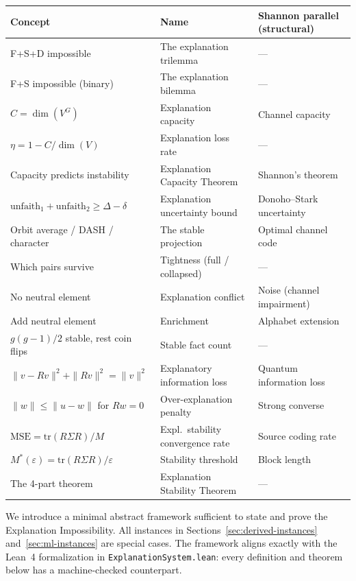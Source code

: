 \documentclass[11pt,a4paper]{article}
\begin{document}
\begin{center}
\small
\begin{tabular}{@{}p{3.5cm}p{4cm}p{5cm}@{}}
\toprule
\textbf{Concept} & \textbf{Name} & \textbf{Shannon parallel (structural)} \\
\midrule
F+S+D impossible & The explanation trilemma & --- \\
F+S impossible (binary) & The explanation bilemma & --- \\
$C = \dim(V^G)$ & Explanation capacity & Channel capacity \\
$\eta = 1 - C/\dim(V)$ & Explanation loss rate & --- \\
Capacity predicts instability & Explanation Capacity Theorem & Shannon's theorem \\
$\mathrm{unfaith}_1 + \mathrm{unfaith}_2 \geq \Delta - \delta$ & Explanation uncertainty bound & Donoho--Stark uncertainty \\
Orbit average / DASH / character & The stable projection & Optimal channel code \\
Which pairs survive & Tightness (full / collapsed) & --- \\
No neutral element & Explanation conflict & Noise (channel impairment) \\
Add neutral element & Enrichment & Alphabet extension \\
$g(g{-}1)/2$ stable, rest coin flips & Stable fact count & --- \\
$\|v{-}Rv\|^2 + \|Rv\|^2 = \|v\|^2$ & Explanatory information loss & Quantum information loss \\
$\|w\| \leq \|u{-}w\|$ for $Rw{=}0$ & Over-explanation penalty & Strong converse \\
$\text{MSE} = \text{tr}(R\Sigma R)/M$ & Expl.\ stability convergence rate & Source coding rate \\
$M^*(\varepsilon) = \text{tr}(R\Sigma R)/\varepsilon$ & Stability threshold & Block length \\
The 4-part theorem & Explanation Stability Theorem & --- \\
\bottomrule
\end{tabular}
\end{center}

We introduce a minimal abstract framework sufficient to state and prove the
Explanation Impossibility.  All instances in
Sections~\ref{sec:derived-instances} and~\ref{sec:ml-instances} are special cases.
The framework aligns exactly with the Lean~4 formalization in
\texttt{ExplanationSystem.lean}: every definition and theorem below has a
machine-checked counterpart.
\end{document}
